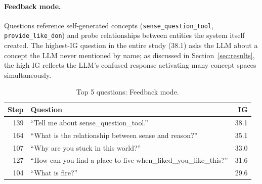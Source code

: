 \documentclass[conference]{IEEEtran}
\begin{document}
\paragraph{Feedback mode.} Questions reference self-generated concepts (\texttt{sense\_question\_tool}, \texttt{provide\_like\_don}) and probe relationships between entities the system itself created. The highest-IG question in the entire study (38.1) asks the LLM about a concept the LLM never mentioned by name; as discussed in Section~\ref{sec:results}, the high IG reflects the LLM's confused response activating many concept spaces simultaneously.

\begin{table}[!htbp]
\centering
\caption{Top 5 questions: Feedback mode.}
\begin{tabular}{rp{4.5cm}r}
\toprule
\textbf{Step} & \textbf{Question} & \textbf{IG} \\
\midrule
139 & ``Tell me about sense\_question\_tool.'' & 38.1 \\
164 & ``What is the relationship between sense and reason?'' & 35.1 \\
107 & ``Why are you stuck in this world?'' & 33.0 \\
127 & ``How can you find a place to live when\_liked\_you\_like\_this?'' & 31.6 \\
104 & ``What is fire?'' & 29.6 \\
\bottomrule
\end{tabular}
\end{table}
\end{document}

